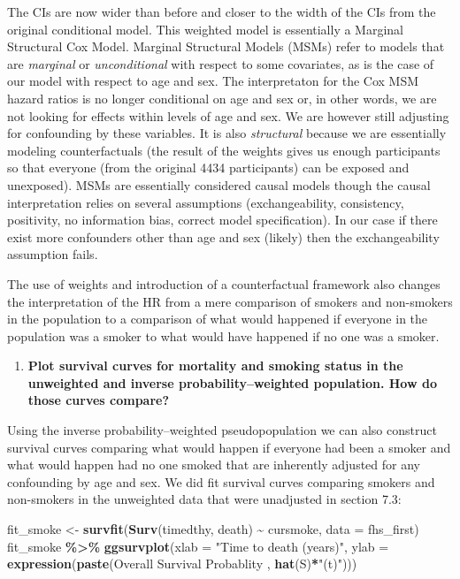 \documentclass[
]{book}
\newenvironment{Shaded}{\begin{snugshade}}{\end{snugshade}}
\newcommand{\AttributeTok}[1]{\textcolor[rgb]{0.13,0.29,0.53}{#1}}
\newcommand{\FunctionTok}[1]{\textcolor[rgb]{0.13,0.29,0.53}{\textbf{#1}}}
\newcommand{\NormalTok}[1]{#1}
\newcommand{\OtherTok}[1]{\textcolor[rgb]{0.56,0.35,0.01}{#1}}
\newcommand{\SpecialCharTok}[1]{\textcolor[rgb]{0.81,0.36,0.00}{\textbf{#1}}}
\newcommand{\StringTok}[1]{\textcolor[rgb]{0.31,0.60,0.02}{#1}}
\providecommand{\tightlist}{%
  \setlength{\itemsep}{0pt}\setlength{\parskip}{0pt}}
\begin{document}
The CIs are now wider than before and closer to the width of the CIs from the original conditional model. This weighted model is essentially a Marginal Structural Cox Model. Marginal Structural Models (MSMs) refer to models that are \emph{marginal} or \emph{unconditional} with respect to some covariates, as is the case of our model with respect to age and sex. The interpretaton for the Cox MSM hazard ratios is no longer conditional on age and sex or, in other words, we are not looking for effects within levels of age and sex. We are however still adjusting for confounding by these variables. It is also \emph{structural} because we are essentially modeling counterfactuals (the result of the weights gives us enough participants so that everyone (from the original 4434 participants) can be exposed and unexposed). MSMs are essentially considered causal models though the causal interpretation relies on several assumptions (exchangeability, consistency, positivity, no information bias, correct model specification). In our case if there exist more confounders other than age and sex (likely) then the exchangeability assumption fails.

The use of weights and introduction of a counterfactual framework also changes the interpretation of the HR from a mere comparison of smokers and non-smokers in the population to a comparison of what would happened if everyone in the population was a smoker to what would have happened if no one was a smoker.

\begin{enumerate}
\def\labelenumi{\arabic{enumi}.}
\setcounter{enumi}{1}
\tightlist
\item
  \textbf{Plot survival curves for mortality and smoking status in the unweighted and inverse probability--weighted population. How do those curves compare?}
\end{enumerate}

Using the inverse probability--weighted pseudopopulation we can also construct survival curves comparing what would happen if everyone had been a smoker and what would happen had no one smoked that are inherently adjusted for any confounding by age and sex. We did fit survival curves comparing smokers and non-smokers in the unweighted data that were unadjusted in section 7.3:

\begin{Shaded}
\begin{Highlighting}[]
\NormalTok{fit\_smoke }\OtherTok{\textless{}{-}} \FunctionTok{survfit}\NormalTok{(}\FunctionTok{Surv}\NormalTok{(timedthy, death) }\SpecialCharTok{\textasciitilde{}}\NormalTok{ cursmoke, }\AttributeTok{data =}\NormalTok{ fhs\_first)}
\NormalTok{fit\_smoke }\SpecialCharTok{\%\textgreater{}\%}
  \FunctionTok{ggsurvplot}\NormalTok{(}\AttributeTok{xlab =} \StringTok{"Time to death (years)"}\NormalTok{,}
             \AttributeTok{ylab =} \FunctionTok{expression}\NormalTok{(}\FunctionTok{paste}\NormalTok{(}\StringTok{\textquotesingle{}Overall Survival Probablity \textquotesingle{}}\NormalTok{, }
                                     \FunctionTok{hat}\NormalTok{(S)}\SpecialCharTok{*}\StringTok{"(t)"}\NormalTok{)))}
\end{Highlighting}
\end{Shaded}
\end{document}
